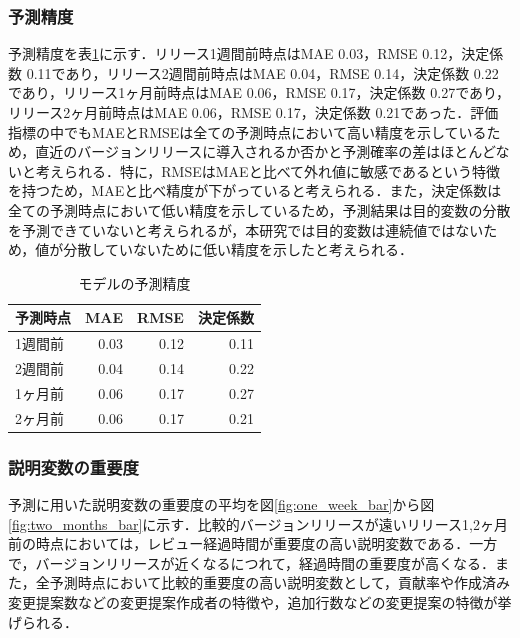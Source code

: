\documentclass[submit,ses,noauthor]{ipsj}
\begin{document}
\subsubsection{予測精度}
予測精度を表\ref{table:hyoukasihyou}に示す．リリース1週間前時点はMAE 0.03，RMSE 0.12，決定係数 0.11であり，リリース2週間前時点はMAE 0.04，RMSE 0.14，決定係数 0.22であり，リリース1ヶ月前時点はMAE 0.06，RMSE 0.17，決定係数 0.27であり，リリース2ヶ月前時点はMAE 0.06，RMSE 0.17，決定係数 0.21であった．評価指標の中でもMAEとRMSEは全ての予測時点において高い精度を示しているため，直近のバージョンリリースに導入されるか否かと予測確率の差はほとんどないと考えられる．特に，RMSEはMAEと比べて外れ値に敏感であるという特徴を持つため，MAEと比べ精度が下がっていると考えられる．また，決定係数は全ての予測時点において低い精度を示しているため，予測結果は目的変数の分散を予測できていないと考えられるが，本研究では目的変数は連続値ではないため，値が分散していないために低い精度を示したと考えられる．

\begin{table}[t]
  \caption{モデルの予測精度}
  \label{table:hyoukasihyou}
  \centering
  \vspace{0.5zh}
 \begin{tabular}{l|r|r|r} \hline
   \multicolumn{1}{c|}{予測時点} & \multicolumn{1}{|c|}{MAE} & \multicolumn{1}{|c|}{RMSE} & \multicolumn{1}{|c}{決定係数} \\ \hline
   1週間前 & 0.03 & 0.12 & 0.11 \\ \hline
   2週間前 & 0.04 & 0.14 & 0.22 \\ \hline
   1ヶ月前 & 0.06 & 0.17 & 0.27 \\ \hline
   2ヶ月前 & 0.06 & 0.17 & 0.21 \\ \hline
 \end{tabular}
\end{table}

\subsubsection{説明変数の重要度}
予測に用いた説明変数の重要度の平均を図\ref{fig:one_week_bar}から図\ref{fig:two_months_bar}に示す．比較的バージョンリリースが遠いリリース1,2ヶ月前の時点においては，レビュー経過時間が重要度の高い説明変数である．一方で，バージョンリリースが近くなるにつれて，経過時間の重要度が高くなる．また，全予測時点において比較的重要度の高い説明変数として，貢献率や作成済み変更提案数などの変更提案作成者の特徴や，追加行数などの変更提案の特徴が挙げられる．
\end{document}
